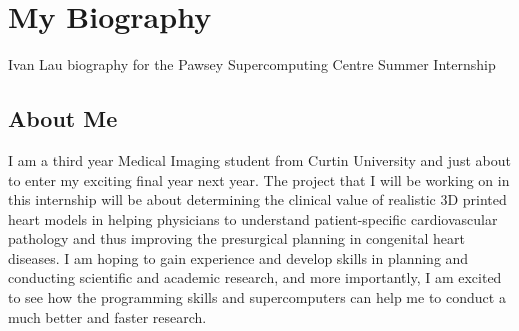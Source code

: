 \section{My Biography}
Ivan Lau biography for the Pawsey Supercomputing Centre Summer Internship

\subsection{About Me}
I am a third year Medical Imaging student from Curtin University and just about to enter my exciting final year next year. The project that I will be working on in this internship will be about determining the clinical value of realistic 3D printed heart models in helping physicians to understand patient-specific cardiovascular pathology and thus improving the presurgical planning in congenital heart diseases. 
I am hoping to gain experience and develop skills in planning and conducting scientific and academic research, and more importantly, I am excited to see how the programming skills and supercomputers can help me to conduct a much better and faster research.


